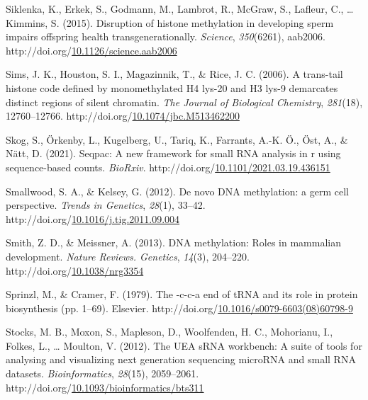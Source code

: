 \documentclass[12pt,twoside]{reedthesis}
\newlength{\cslhangindent}
\newenvironment{CSLReferences}[2] %
 {%
  \setlength{\parindent}{0pt}
  \ifodd #1 \everypar{\setlength{\hangindent}{\cslhangindent}}\ignorespaces\fi
  \ifnum #2 > 0
  \setlength{\parskip}{#2\baselineskip}
  \fi
 }%
 {}
\begin{document}
\begin{CSLReferences}{1}{0}
\leavevmode{}%
Siklenka, K., Erkek, S., Godmann, M., Lambrot, R., McGraw, S., Lafleur, C., \ldots{} Kimmins, S. (2015). Disruption of histone methylation in developing sperm impairs offspring health transgenerationally. \emph{Science}, \emph{350}(6261), aab2006. http://doi.org/\href{https://doi.org/10.1126/science.aab2006}{10.1126/science.aab2006}

\leavevmode{}%
Sims, J. K., Houston, S. I., Magazinnik, T., \& Rice, J. C. (2006). A trans-tail histone code defined by monomethylated H4 lys-20 and H3 lys-9 demarcates distinct regions of silent chromatin. \emph{The Journal of Biological Chemistry}, \emph{281}(18), 12760--12766. http://doi.org/\href{https://doi.org/10.1074/jbc.M513462200}{10.1074/jbc.M513462200}

\leavevmode{}%
Skog, S., Örkenby, L., Kugelberg, U., Tariq, K., Farrants, A.-K. Ö., Öst, A., \& Nätt, D. (2021). Seqpac: A new framework for small RNA analysis in r using sequence-based counts. \emph{BioRxiv}. http://doi.org/\href{https://doi.org/10.1101/2021.03.19.436151}{10.1101/2021.03.19.436151}

\leavevmode{}%
Smallwood, S. A., \& Kelsey, G. (2012). De novo DNA methylation: a germ cell perspective. \emph{Trends in Genetics}, \emph{28}(1), 33--42. http://doi.org/\href{https://doi.org/10.1016/j.tig.2011.09.004}{10.1016/j.tig.2011.09.004}

\leavevmode{}%
Smith, Z. D., \& Meissner, A. (2013). DNA methylation: Roles in mammalian development. \emph{Nature Reviews. Genetics}, \emph{14}(3), 204--220. http://doi.org/\href{https://doi.org/10.1038/nrg3354}{10.1038/nrg3354}

\leavevmode{}%
Sprinzl, M., \& Cramer, F. (1979). The -c-c-a end of tRNA and its role in protein biosynthesis (pp. 1--69). Elsevier. http://doi.org/\href{https://doi.org/10.1016/s0079-6603(08)60798-9}{10.1016/s0079-6603(08)60798-9}

\leavevmode{}%
Stocks, M. B., Moxon, S., Mapleson, D., Woolfenden, H. C., Mohorianu, I., Folkes, L., \ldots{} Moulton, V. (2012). The UEA sRNA workbench: A suite of tools for analysing and visualizing next generation sequencing microRNA and small RNA datasets. \emph{Bioinformatics}, \emph{28}(15), 2059--2061. http://doi.org/\href{https://doi.org/10.1093/bioinformatics/bts311}{10.1093/bioinformatics/bts311}


\end{CSLReferences}
\end{document}
